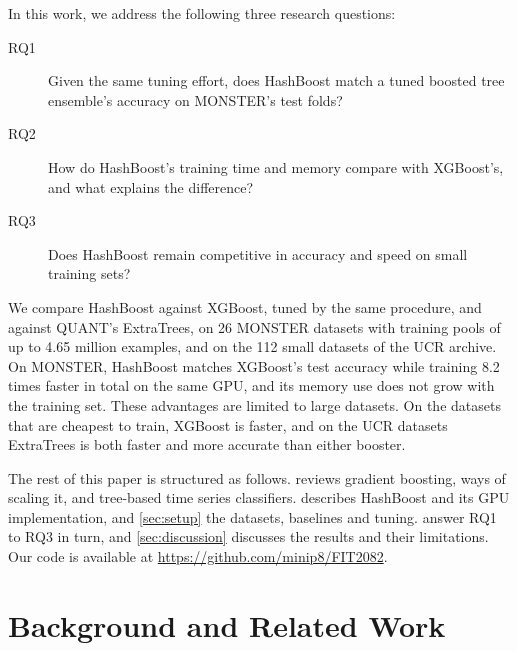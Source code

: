 \documentclass[a4paper, 11pt]{article}
\begin{document}
In this work, we address the following three research questions:
\begin{description}
    \item[RQ1] Given the same tuning effort, does HashBoost match a tuned
          boosted tree ensemble's accuracy on MONSTER's test folds?
    \item[RQ2] How do HashBoost's training time and memory compare with
          XGBoost's, and what explains the difference?
    \item[RQ3] Does HashBoost remain competitive in accuracy and speed on
          small training sets?
\end{description}
We compare HashBoost against XGBoost, tuned by the same procedure, and
against QUANT's ExtraTrees, on 26 MONSTER datasets with training pools of up
to 4.65 million examples, and on the 112 small datasets of the UCR archive.
On MONSTER, HashBoost matches XGBoost's test accuracy while training 8.2
times faster in total on the same GPU, and its memory use does not grow with
the training set. These advantages are limited to large datasets. On the
datasets that are cheapest to train, XGBoost is faster, and on the UCR
datasets ExtraTrees is both faster and more accurate than either booster.

The rest of this paper is structured as follows.  reviews
gradient boosting, ways of scaling it, and tree-based time series
classifiers.  describes HashBoost and its GPU
implementation, and \cref{sec:setup} the datasets, baselines and tuning.
 answer RQ1 to RQ3 in turn, and
\cref{sec:discussion} discusses the results and their limitations. Our code
is available at \url{https://github.com/minip8/FIT2082}.

\section{Background and Related Work}
\label{sec:related}
\end{document}
